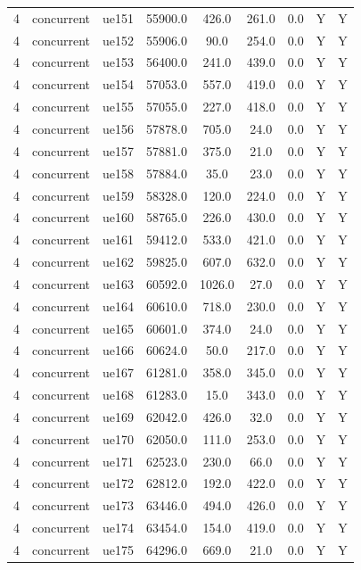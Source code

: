 \begin{table}[ht]
\begin{tabular}{|c|c|c|c|c|c|c|c|c|}
4 & concurrent & ue151 & 55900.0 & 426.0 & 261.0 & 0.0 & Y & Y \\
4 & concurrent & ue152 & 55906.0 & 90.0 & 254.0 & 0.0 & Y & Y \\
4 & concurrent & ue153 & 56400.0 & 241.0 & 439.0 & 0.0 & Y & Y \\
4 & concurrent & ue154 & 57053.0 & 557.0 & 419.0 & 0.0 & Y & Y \\
4 & concurrent & ue155 & 57055.0 & 227.0 & 418.0 & 0.0 & Y & Y \\
4 & concurrent & ue156 & 57878.0 & 705.0 & 24.0 & 0.0 & Y & Y \\
4 & concurrent & ue157 & 57881.0 & 375.0 & 21.0 & 0.0 & Y & Y \\
4 & concurrent & ue158 & 57884.0 & 35.0 & 23.0 & 0.0 & Y & Y \\
4 & concurrent & ue159 & 58328.0 & 120.0 & 224.0 & 0.0 & Y & Y \\
4 & concurrent & ue160 & 58765.0 & 226.0 & 430.0 & 0.0 & Y & Y \\
4 & concurrent & ue161 & 59412.0 & 533.0 & 421.0 & 0.0 & Y & Y \\
4 & concurrent & ue162 & 59825.0 & 607.0 & 632.0 & 0.0 & Y & Y \\
4 & concurrent & ue163 & 60592.0 & 1026.0 & 27.0 & 0.0 & Y & Y \\
4 & concurrent & ue164 & 60610.0 & 718.0 & 230.0 & 0.0 & Y & Y \\
4 & concurrent & ue165 & 60601.0 & 374.0 & 24.0 & 0.0 & Y & Y \\
4 & concurrent & ue166 & 60624.0 & 50.0 & 217.0 & 0.0 & Y & Y \\
4 & concurrent & ue167 & 61281.0 & 358.0 & 345.0 & 0.0 & Y & Y \\
4 & concurrent & ue168 & 61283.0 & 15.0 & 343.0 & 0.0 & Y & Y \\
4 & concurrent & ue169 & 62042.0 & 426.0 & 32.0 & 0.0 & Y & Y \\
4 & concurrent & ue170 & 62050.0 & 111.0 & 253.0 & 0.0 & Y & Y \\
4 & concurrent & ue171 & 62523.0 & 230.0 & 66.0 & 0.0 & Y & Y \\
4 & concurrent & ue172 & 62812.0 & 192.0 & 422.0 & 0.0 & Y & Y \\
4 & concurrent & ue173 & 63446.0 & 494.0 & 426.0 & 0.0 & Y & Y \\
4 & concurrent & ue174 & 63454.0 & 154.0 & 419.0 & 0.0 & Y & Y \\
4 & concurrent & ue175 & 64296.0 & 669.0 & 21.0 & 0.0 & Y & Y \\

\end{tabular}
\end{table}

